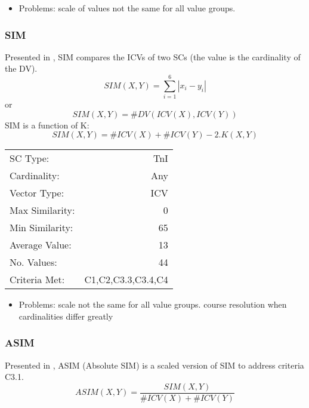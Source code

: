 \documentclass{article}
\begin{document}
\begin{itemize}
\item Problems: scale of values not the same for all value groups.
\end{itemize}
\subsubsection{SIM}
\label{sec-11-1-2}

Presented in \citet[pp. 446]{Morris1979}, SIM compares the ICVs of
two SCs (the value is the cardinality of the DV).
$$SIM\left(X,Y\right)=\sum_{i=1}^{6}\left|x_{i}-y_{i}\right|$$
or
$$SIM\left(X,Y\right)=\#DV\left(ICV\left(X\right),ICV\left(Y\right)\right)$$
SIM is a function of K:
$$SIM(X,Y) = \#ICV(X) + \#ICV(Y) - 2.K(X,Y)$$

\begin{center}
\begin{tabular}{lr}
 SC Type:         &                 TnI  \\
 Cardinality:     &                 Any  \\
 Vector Type:     &                 ICV  \\
 Max Similarity:  &                   0  \\
 Min Similarity:  &                  65  \\
 Average Value:   &                  13  \\
 No. Values:      &                  44  \\
 Criteria Met:    &  C1,C2,C3.3,C3.4,C4  \\
\end{tabular}
\end{center}


\begin{itemize}
\item Problems: scale not the same for all value groups. course resolution
  when cardinalities differ greatly
\end{itemize}
\subsubsection{ASIM}
\label{sec-11-1-3}

Presented in \citet[pp. 450]{Morris1979}, ASIM (Absolute SIM) is a
scaled version of SIM to address criteria C3.1.
$$ASIM\left(X,Y\right)=\frac{SIM\left(X,Y\right)}{\#ICV\left(X\right)+\#ICV\left(Y\right)}$$
\end{document}
